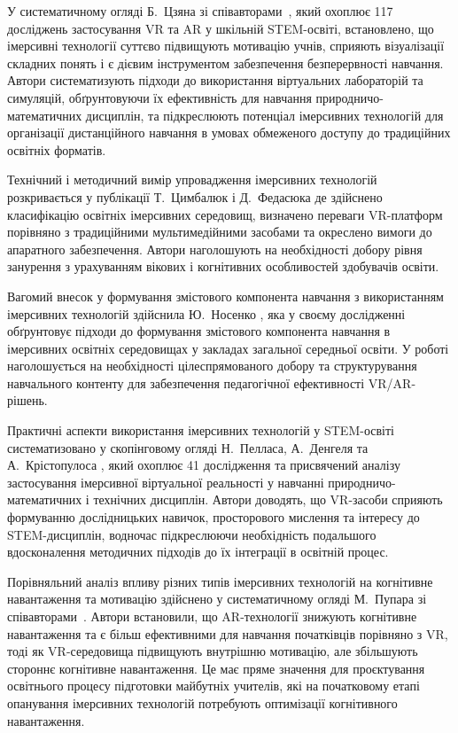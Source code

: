 У систематичному огляді Б.~Цзяна зі співавторами~\cite{Nosenko2023Blended}, який охоплює 117 досліджень застосування VR та AR у шкільній STEM-освіті, встановлено, що імерсивні технології суттєво підвищують мотивацію учнів, сприяють візуалізації складних понять і є дієвим інструментом забезпечення безперервності навчання. Автори систематизують підходи до використання віртуальних лабораторій та симуляцій, обґрунтовуючи їх ефективність для навчання природничо-математичних дисциплін, та підкреслюють потенціал імерсивних технологій для організації дистанційного навчання в умовах обмеженого доступу до традиційних освітніх форматів.

Технічний і методичний вимір упровадження імерсивних технологій розкривається у публікації Т.~Цимбалюк і Д.~Федасюка \cite{Tsymbaliuk2024Classification} де здійснено класифікацію освітніх імерсивних середовищ, визначено переваги VR-платформ порівняно з традиційними мультимедійними засобами та окреслено вимоги до апаратного забезпечення. Автори наголошують на необхідності добору рівня занурення з урахуванням вікових і когнітивних особливостей здобувачів освіти.

Вагомий внесок у формування змістового компонента навчання з використанням імерсивних технологій здійснила Ю.~Носенко \cite{Nosenko2025ITE}, яка у своєму дослідженні обґрунтовує підходи до формування змістового компонента навчання в імерсивних освітніх середовищах у закладах загальної середньої освіти. У роботі наголошується на необхідності цілеспрямованого добору та структурування навчального контенту для забезпечення педагогічної ефективності VR/AR-рішень.

Практичні аспекти використання імерсивних технологій у STEM-освіті систематизовано у скопінговому огляді Н.~Пелласа, А.~Денгеля та А.~Крістопулоса \cite{Drokina2025STEM}, який охоплює 41 дослідження та присвячений аналізу застосування імерсивної віртуальної реальності у навчанні природничо-математичних і технічних дисциплін. Автори доводять, що VR-засоби сприяють формуванню дослідницьких навичок, просторового мислення та інтересу до STEM-дисциплін, водночас підкреслюючи необхідність подальшого вдосконалення методичних підходів до їх інтеграції в освітній процес.

Порівняльний аналіз впливу різних типів імерсивних технологій на когнітивне навантаження та мотивацію здійснено у систематичному огляді М.~Пупара зі співавторами~\cite{Poupard2024Systematic}. Автори встановили, що AR-технології знижують когнітивне навантаження та є більш ефективними для навчання початківців порівняно з VR, тоді як VR-середовища підвищують внутрішню мотивацію, але збільшують стороннє когнітивне навантаження. Це має пряме значення для проєктування освітнього процесу підготовки майбутніх учителів, які на початковому етапі опанування імерсивних технологій потребують оптимізації когнітивного навантаження.

